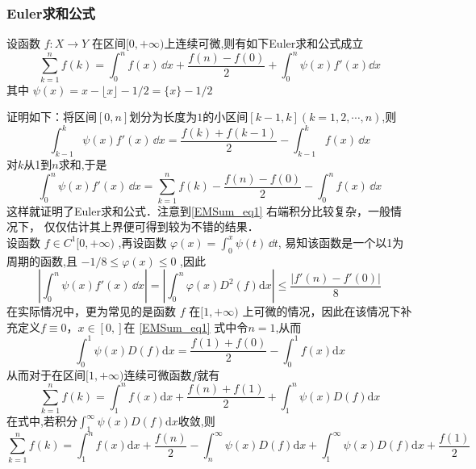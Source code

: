 
\subsubsection{Euler求和公式}
\begin{theorem}{}
    设函数 $f:X\to Y$ 在区间$[0,+\infty)$上连续可微,则有如下Euler求和公式成立	
        \begin{equation}\label{EMSum_eq1} 
            \sum_{k=1}^{n}f(k)=\int_{0}^{n}f(x)\,\dd x
            +\frac{f(n)-f(0)}{2}+\int_{0}^{n}\psi(x)f'(x)\dd x
        \end{equation}
    其中 $\psi(x)=x-\lfloor x \rfloor-1/2=\{x\}-1/2$
\end{theorem}
证明如下：将区间$[0,n]$划分为长度为$1$的小区间$[k-1,k](k=1,2,\cdots,n)$,则
​\[
    \int_{k-1}^{k}\psi(x)f'(x)\,\dd x
    =\frac{f(k)+f(k-1)}{2}-\int_{k-1}^{k}f(x)\,\dd x
\]
​对$k$从1到$n$求和,于是
​\[
    \int_{0}^{n}\psi(x)f'(x)\,\dd x
    =\sum_{k=1}^{n}f(k)-\frac{f(n)-f(0)}{2}-\int_{0}^{n}f(x)\,\dd x
\]
这样就证明了Euler求和公式．注意到\autoref{EMSum_eq1} 右端积分比较复杂，一般情况下，
仅仅估计其上界便可得到较为不错的结果．\\
设函数 $f\in{C^1[0,+\infty)}$ ,再设函数
$\varphi(x)=\displaystyle{\int_{0}^{x}\psi(t)\,\dd t}$,
易知该函数是一个以1为周期的函数,且
 $-1/8\leqslant\varphi(x)\leqslant 0$ ,因此
\begin{equation}
    \left|\int_{0}^{n}\psi(x)f'(x)\,\dd x\right|
    =\left|\int_{0}^{n}\varphi(x)D^2(f)\mathrm{d}x\right|
    \leqslant\frac{|f'(n)-f'(0)|}{8}
\end{equation}
在实际情况中，更为常见的是函数 $f$ 在$[1,+\infty)$ 上可微的情况，因此在该情况下补充定义$f\equiv 0，x\in[0,]$在 \autoref{EMSum_eq1} 式中令$n=1$,从而
\[
    \int_{0}^{1}\psi(x)D(f)\mathrm{d}x=\frac{f(1)+f(0)}{2}-\int_{0}^{1}f(x)\mathrm{d}x
\]
从而对于在区间$[1,+\infty)$连续可微函数$f$就有
	\begin{equation}
		\sum_{k=1}^{n}f(k)=\int_{1}^{n}f(x)\mathrm{d}x+\frac{f(n)+f(1)}{2}+\int_{1}^{n}\psi(x)D(f)\mathrm{d}x
	\end{equation}
	在式中,若积分$\displaystyle{\int_{1}^{\infty}\psi(x)D(f)\mathrm{d}x}$收敛,则
	\begin{equation}
		\sum_{k=1}^{n}f(k)=\int_{1}^{n}f(x)\mathrm{d}x+\frac{f(n)}{2}-\int_{n}^{\infty}\psi(x)D(f)\mathrm{d}x
		+\int_{1}^{\infty}\psi(x)D(f)\mathrm{d}x+\frac{f(1)}{2}
	\end{equation}